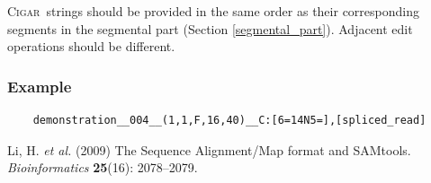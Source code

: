 \documentclass[10pt,a4paper]{article}
\newcommand{\CIGAR}{\textsc{Cigar}}
\begin{document}
\medskip

\CIGAR\ strings should be provided in the same order as their corresponding segments in the {segmental part} (Section \ref{segmental_part}). Adjacent edit operations should be different.

\subsubsection*{Example}

\begin{framed}\small
\begin{verbatim}
	demonstration__004__(1,1,F,16,40)__C:[6=14N5=],[spliced_read]
\end{verbatim}
\end{framed}





\begin{thebibliography}{}
	Li, H. \textit{et al.} (2009)
	The Sequence Alignment/Map format and SAMtools.
	\textit{Bioinformatics} \textbf{25}(16): 2078--2079.
\end{thebibliography}
\end{document}
